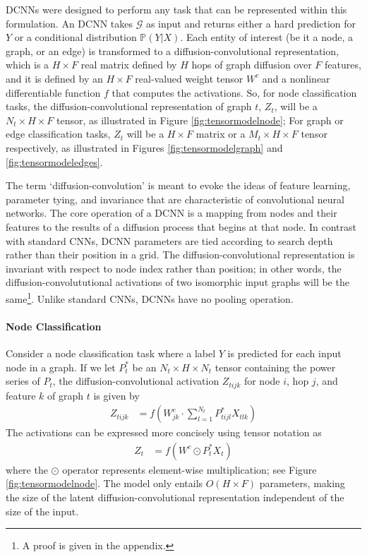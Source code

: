 \documentclass{article}
\begin{document}
DCNNs were designed to perform any task that can be represented within this formulation.  An DCNN takes $\mathcal{G}$ as input and returns either a hard prediction for $Y$ or a conditional distribution $\mathbb{P}(Y|X)$.  Each entity of interest (be it a node, a graph, or an edge) is transformed to a diffusion-convolutional representation, which is a $H \times F$ real matrix defined by $H$ hops of graph diffusion over $F$ features, and it is defined by an $H \times F$ real-valued weight tensor $W^c$ and a nonlinear differentiable function $f$ that computes the activations.  So, for node classification tasks, the diffusion-convolutional representation of graph $t$, $Z_t$, will be a $N_t \times H \times F$ tensor, as illustrated in Figure \ref{fig:tensormodelnode};  For graph or edge classification tasks, $Z_t$ will be a $H \times F$ matrix or a $M_t \times H \times F$ tensor respectively, as illustrated in Figures \ref{fig:tensormodelgraph} and \ref{fig:tensormodeledges}.

The term `diffusion-convolution' is meant to evoke the ideas of feature learning, parameter tying, and invariance that are characteristic of convolutional neural networks.  The core operation of a DCNN is a mapping from nodes and their features to the results of a diffusion process that begins at that node.  In contrast with standard CNNs, DCNN parameters are tied according to search depth rather than their position in a grid.  The diffusion-convolutional representation is invariant with respect to node index rather than position; in other words, the diffusion-convolututional activations of two isomorphic input graphs will be the same\footnote{A proof is given in the appendix.}.  Unlike standard CNNs, DCNNs have no pooling operation.

\paragraph{Node Classification}
Consider a node classification task where a label $Y$ is predicted for each input node in a graph.  If we let $P_t^{*}$ be an $N_t \times H \times N_t$ tensor containing the power series of $P_t$, the diffusion-convolutional activation $Z_{tijk}$ for node $i$, hop $j$, and feature $k$ of graph $t$ is given by
\begin{align}
    Z_{tijk} &= f\left(W^c_{jk} \cdot \sum\limits_{l=1}^{N_t} P^*_{tijl} X_{tlk}\right)
\end{align}
The activations can be expressed more concisely using tensor notation as
\begin{align}
    Z_t &= f\left(W^c \odot P_t^* X_t\right)
    \label{eqn:activations}
\end{align}
where the $\odot$ operator represents element-wise multiplication; see Figure \ref{fig:tensormodelnode}.  The model only entails $O(H \times F)$ parameters, making the size of the latent diffusion-convolutional representation independent of the size of the input.
\end{document}
